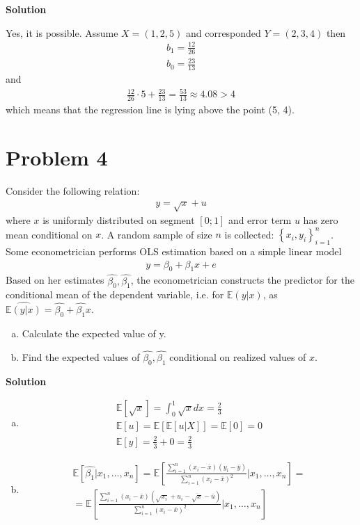 \documentclass[a4paper]{article}
\newcommand{\expect}{\mathbb{E}}
\begin{document}
 
 \textbf{Solution}
 
 
 Yes, it is possible. Assume $X = (1, 2, 5)$ and corresponded $Y = (2, 3, 4)$ then
 \begin{align*}
 b_1 = \frac{12}{26}\\
 b_0 = \frac{23}{13}
 \end{align*}
 and
 \begin{align*}
 \frac{12}{26} \cdot 5 + \frac{23}{13} = \frac{53}{13} \approx 4.08 > 4
 \end{align*}
 which means that the regression line is lying above the point (5, 4).
 
 
 \section*{Problem 4}
  Consider the following relation:
\begin{align*}
y = \sqrt{x} + u
\end{align*}
 where $x$ is uniformly distributed on segment $[0; 1]$ and error term $u$ has zero mean
 conditional on $x$. A random sample of size $n$ is collected: $\left\{x_i, y_i\right\}_{i=1}^n$. Some econometrician
 performs OLS estimation based on a simple linear model 
 \begin{align*}
	y = \beta_0 + \beta_1x + e
\end{align*}
 Based on her estimates $\hat{\beta_0}, \hat{\beta_1}$, the econometrician constructs the predictor for the conditional mean of the dependent variable, i.e. for $\expect(y|x)$, as $\widehat{\expect(y|x)} = \hat{\beta_0} + \hat{\beta_1} x$.
 \begin{enumerate}[a.]
 \item Calculate the expected value of y.
 \item Find the expected values of $\hat{\beta_0}, \hat{\beta_1}$ conditional on realized values of $x$.
 \end{enumerate}


\textbf{Solution}
\begin{enumerate}[a.]
	\item 
	\begin{align*}
	\expect[\sqrt{x}] = \int_{0}^1 \sqrt{x}dx = \frac{2}{3}\\
	\expect[u] = \expect[\expect[u|X]] = \expect[0] = 0\\
	\expect[y] = \frac{2}{3} + 0 = \frac{2}{3}
	\end{align*}
	\item
	\begin{align*}
	\expect[\hat{\beta_1}|x_1, \dots, x_n] = \expect \left[\frac{\sum_{i=1}^n (x_i - \bar{x})(y_i - \bar{y})}{\sum_{i=1}^n (x_i - \bar{x})^2}\bigg|x_1, \dots, x_n\right] =\\
	= \expect \left[\frac{\sum_{i=1}^n (x_i - \bar{x})(\sqrt{x_i} + u_i - \overline{\sqrt{x}} -  \bar{u})}{\sum_{i=1}^n (x_i - \bar{x})^2}\bigg|x_1, \dots, x_n\right]
	\end{align*}
	\end{enumerate}
\end{document}

